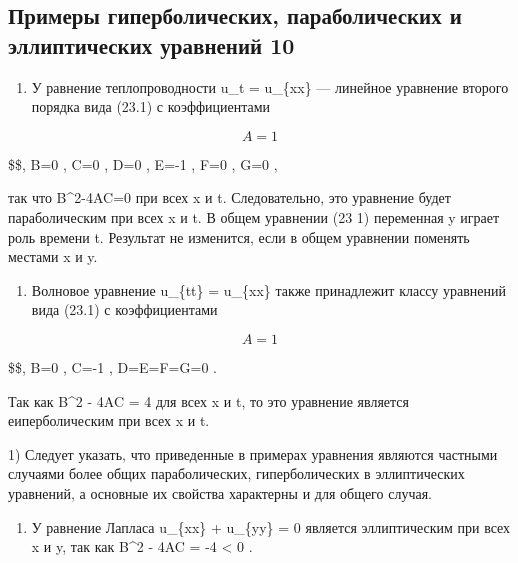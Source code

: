 \documentclass[
  ukrainian,
]{article}
\providecommand{\tightlist}{%
  \setlength{\itemsep}{0pt}\setlength{\parskip}{0pt}}
\begin{document}
\subsection{Примеры гиперболических, параболических и эллиптических
уравнений
10}\label{ux43fux440ux438ux43cux435ux440ux44b-ux433ux438ux43fux435ux440ux431ux43eux43bux438ux447ux435ux441ux43aux438ux445-ux43fux430ux440ux430ux431ux43eux43bux438ux447ux435ux441ux43aux438ux445-ux438-ux44dux43bux43bux438ux43fux442ux438ux447ux435ux441ux43aux438ux445-ux443ux440ux430ux432ux43dux435ux43dux438ux439-10}

\begin{enumerate}
\def\labelenumi{\arabic{enumi}.}
\tightlist
\item
  У равнение теплопроводности u\_t = u\_\{xx\} --- линейное уравнение
  второго порядка вида (23.1) с коэффициентами
\end{enumerate}

\[
A=1
\]

\$\$, B=0 , C=0 , D=0 , E=-1 , F=0 , G=0 ,

так что B\^{}2-4AC=0 при всех x и t. Следовательно, это уравнение будет
параболическим при всех x и t. В общем уравнении (23 1) переменная y
играет роль времени t. Результат не изменится, если в общем уравнении
поменять местами x и y.

\begin{enumerate}
\def\labelenumi{\arabic{enumi}.}
\setcounter{enumi}{1}
\tightlist
\item
  Волновое уравнение u\_\{tt\} = u\_\{xx\} также принадлежит классу
  уравнений вида (23.1) с коэффициентами
\end{enumerate}

\[
A=1
\]

\$\$, B=0 , C=-1 , D=E=F=G=0 .

Так как B\^{}2 - 4AC = 4 для всех x и t, то это уравнение является
еиперболическим при всех x и t.

1) Следует указать, что приведенные в примерах уравнения являются
частными случаями более общих параболических, гиперболических в
эллиптических уравнений, а основные их свойства характерны и для общего
случая.

\begin{enumerate}
\def\labelenumi{\arabic{enumi}.}
\setcounter{enumi}{2}
\tightlist
\item
  У равнение Лапласа u\_\{xx\} + u\_\{yy\} = 0 является эллиптическим
  при всех x и y, так как B\^{}2 - 4AC = -4 \textless{} 0 .
\end{enumerate}
\end{document}
